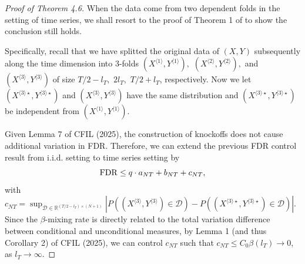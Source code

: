 ﻿\documentclass[12pt]{article}
\newcommand{\0}{\mbox{\bf 0}}
\theoremstyle{plain}%
\theoremstyle{definition}
\def\func#1{\mathop{\rm #1}}%
\begin{document}
{\begin{proof}[Proof of Theorem 4.6]
When the data come from two dependent folds in the setting of time series,
we shall resort to the proof of Theorem 1 of \citet*[CFIL]{ChiFanIngLv2025} to show the
conclusion still holds.

Specifically, recall that we have splitted the original data of $(X,Y)$
subsequently along the time dimension into 3-folds $\left( X^{\langle
1\rangle },Y^{\langle 1\rangle }\right) ,$ $\left( X^{\langle 2\rangle
},Y^{\langle 2\rangle }\right) ,$ and $\left( X^{\langle 3\rangle
},Y^{\langle 3\rangle }\right) $ of size $T/2-l_T,$ $2l_T,$ $T/2+l_T$,
respectively. Now we let $\left( X^{\langle 3\rangle \star },Y^{\langle
3\rangle \star }\right) $ and $\left( X^{\langle 3\rangle },Y^{\langle
3\rangle }\right) $ have the same distribution and $\left( X^{\langle
3\rangle \star },Y^{\langle 3\rangle \star }\right) $ be independent from $%
\left( X^{\langle 1\rangle },Y^{\langle 1\rangle }\right) .$

Given Lemma 7 of CFIL (2025), the construction of knockoffs does not cause
additional variation in FDR. Therefore, we can extend the previous FDR
control result from i.i.d. setting to time series setting by 
\begin{equation*}
\func{FDR}\leq q\cdot a_{NT}+b_{NT}+c_{NT},
\end{equation*}%
with $c_{NT}=\sup_{\mathcal{D\in }\mathbb{R}^{\left(T/2-l_T\right) \times
(N+1)}}\left\vert P\left( \left( X^{\langle 3\rangle },Y^{\langle 3\rangle
}\right) \in \mathcal{D}\right) -P\left( \left( X^{\langle 3\rangle \star
},Y^{\langle 3\rangle \star }\right) \in \mathcal{D}\right) \right\vert $.
Since the $\beta $-mixing rate is directly related to the total variation
difference between conditional and unconditional measures, by Lemma 1 (and
thus Corollary 2) of CFIL (2025), we can control $c_{NT}$ such that $%
c_{NT}\leq C_{0} \beta(l_T) \rightarrow 0$, as $l_T \rightarrow \infty$.
\end{proof}

\bigskip

}
\end{document}
